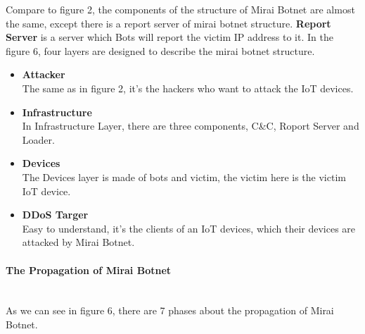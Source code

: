 \documentclass[conference]{IEEEtran}
\begin{document}
Compare to figure 2,  the components of the structure of  Mirai Botnet are almost the same, except there is a report server of mirai botnet structure.
\textbf{Report Server} is a server which Bots will report the victim IP address to it.
In the figure 6\cite{b1}, four layers are designed to describe the mirai botnet structure.

\begin{itemize}
\item{ \textbf{Attacker}}\\
The same as in figure 2, it's the hackers who want to attack the IoT devices.
\item{\textbf{Infrastructure}}\\
In Infrastructure Layer, there are three components, C\&C, Roport Server and Loader.
\item{\textbf{Devices}}\\
The Devices layer is made of bots and victim, the victim here is the victim IoT device.
\item{\textbf{DDoS Targer}}\\
Easy to understand, it's the clients of an IoT devices, which their devices are attacked by Mirai Botnet.

\end{itemize}
\paragraph{\textbf{The Propagation of Mirai Botnet}}\\
As we can see in figure 6, there are 7 phases about the propagation of Mirai Botnet.
\end{document}
